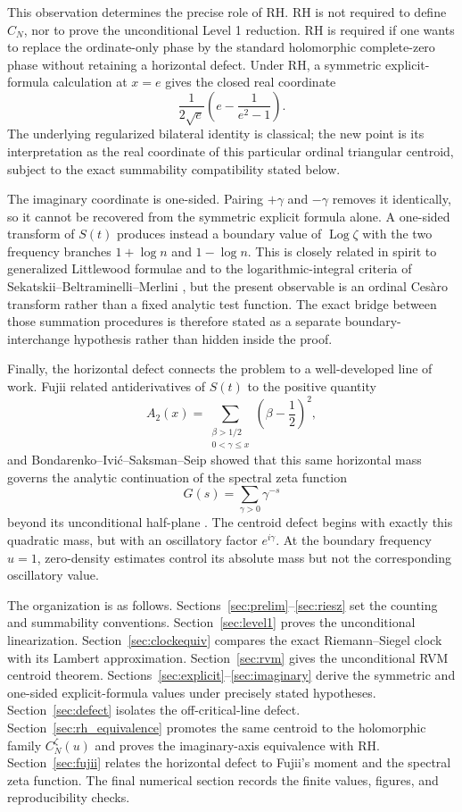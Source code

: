 \documentclass[11pt]{amsart}
\numberwithin{equation}{section}
\theoremstyle{definition}
\theoremstyle{remark}
\newcommand{\Log}{\operatorname{Log}}
\begin{document}
This observation determines the precise role of RH. RH is not required to define $C_N$, nor to prove the unconditional Level 1 reduction. RH is required if one wants to replace the ordinate-only phase by the standard holomorphic complete-zero phase without retaining a horizontal defect. Under RH, a symmetric explicit-formula calculation at $x=e$ gives the closed real coordinate
\[
\frac{1}{2\sqrt e}\left(e-\frac1{e^2-1}\right).
\]
The underlying regularized bilateral identity is classical; the new point is its interpretation as the real coordinate of this particular ordinal triangular centroid, subject to the exact summability compatibility stated below.

The imaginary coordinate is one-sided. Pairing $+\gamma$ and $-\gamma$ removes it identically, so it cannot be recovered from the symmetric explicit formula alone. A one-sided transform of $S(t)$ produces instead a boundary value of $\Log\zeta$ with the two frequency branches $1+\log n$ and $1-\log n$. This is closely related in spirit to generalized Littlewood formulae and to the logarithmic-integral criteria of Sekatskii--Beltraminelli--Merlini \cite{Sekatskii2008,Sekatskii2009,Sekatskii2010}, but the present observable is an ordinal Cesàro transform rather than a fixed analytic test function. The exact bridge between those summation procedures is therefore stated as a separate boundary-interchange hypothesis rather than hidden inside the proof.

Finally, the horizontal defect connects the problem to a well-developed line of work. Fujii related antiderivatives of $S(t)$ to the positive quantity
\[
A_2(x)=\sum_{\substack{\beta>1/2\\0<\gamma\leq x}}
\left(\beta-\frac12\right)^2,
\]
and Bondarenko--Ivić--Saksman--Seip showed that this same horizontal mass governs the analytic continuation of the spectral zeta function
\[
G(s)=\sum_{\gamma>0}\gamma^{-s}
\]
beyond its unconditional half-plane \cite{Fujii2002,BondarenkoIvicSaksmanSeip2019}. The centroid defect begins with exactly this quadratic mass, but with an oscillatory factor $e^{i\gamma}$. At the boundary frequency $u=1$, zero-density estimates control its absolute mass but not the corresponding oscillatory value.

The organization is as follows. Sections~\ref{sec:prelim}--\ref{sec:riesz} set the counting and summability conventions. Section~\ref{sec:level1} proves the unconditional linearization. Section~\ref{sec:clockequiv} compares the exact Riemann--Siegel clock with its Lambert approximation. Section~\ref{sec:rvm} gives the unconditional RVM centroid theorem. Sections~\ref{sec:explicit}--\ref{sec:imaginary} derive the symmetric and one-sided explicit-formula values under precisely stated hypotheses. Section~\ref{sec:defect} isolates the off-critical-line defect. Section~\ref{sec:rh_equivalence} promotes the same centroid to the holomorphic family $C_N^{\zeta}(u)$ and proves the imaginary-axis equivalence with RH. Section~\ref{sec:fujii} relates the horizontal defect to Fujii's moment and the spectral zeta function. The final numerical section records the finite values, figures, and reproducibility checks.
\end{document}
